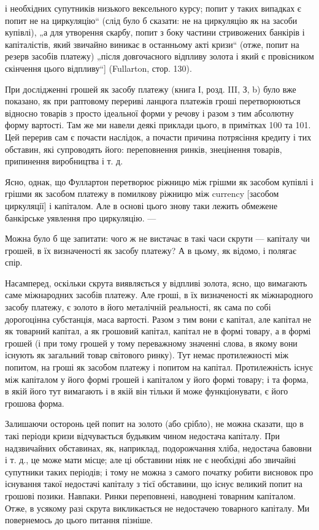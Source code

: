 \parcont{}  %
і необхідних супутників низького вексельного курсу; попит у таких
випадках є попит не на циркуляцію“ (слід було б сказати:
не на циркуляцію як на засоби купівлі), „а для утворення скарбу,
попит з боку частини стривожених банкірів і капіталістів, який
звичайно виникає в останньому акті кризи“ (отже, попит на резерв
засобів платежу) „після довгочасного відпливу золота і який є
провісником скінчення цього відпливу“] (Fullarton, стор. 130).

При дослідженні грошей як засобу платежу (книга І, розд. III,
З, b) було вже показано, як при раптовому перериві ланцюга платежів
гроші перетворюються відносно товарів з просто ідеальної
форми у речову і разом з тим абсолютну форму вартостi.
Там же ми навели деякі приклади цього, в примітках 100 та 101.
Цей перерив сам є почасти наслідок, а почасти причина потрясіння
кредиту і тих обставин, які супроводять його: переповнення
ринків, знецінення товарів, припинення виробництва і т. д.

Ясно, однак, що Фуллартон перетворює ріжницю між грішми як
засобом купівлі і грішми як засобом платежу в помилкову ріжницю
між currency [засобом циркуляції] і капіталом. Але в основі
цього знову таки лежить обмежене банкірське уявлення про
циркуляцію. —

Можна було б ще запитати: чого ж не вистачає в такі часи
скрути — капіталу чи грошей, в їх визначеності як засобу платежу?
А в цьому, як відомо, і полягає спір.

Насамперед, оскільки скрута виявляється у відпливі золота,
ясно, що вимагають саме міжнародних засобів платежу. Але
гроші, в їх визначеності як міжнародного засобу платежу, є
золото в його металічній реальності, як сама по собі дорогоцінна
субстанція, маса вартості. Разом з тим вони є капітал, але капітал
не як товарний капітал, а як грошовий капітал, капітал не
в формі товару, а в формі грошей (і при тому грошей у тому
переважному значенні слова, в якому вони існують як загальний
товар світового ринку). Тут немає протилежності між попитом,
на гроші як засобом платежу і попитом на капітал. Протилежність
існує між капіталом у його формі грошей і капіталом у
його формі товару; і та форма, в якій його тут вимагають і в
якій він тільки й може функціонувати, є його грошова форма.

Залишаючи осторонь цей попит на золото (або срібло), не
можна сказати, що в такі періоди кризи відчувається будьяким
чином недостача капіталу. При надзвичайних обставинах, як,
наприклад, подорожчання хліба, недостача бавовни і т. д., це
може мати місце; але ці обставини ніяк не є необхідні або звичайні
супутники таких періодів; і тому не можна з самого початку
робити висновок про існування такої недостачі капіталу
з тієї обставини, що існує великий попит на грошові позики.
Навпаки. Ринки переповнені, наводнені товарним капіталом.
Отже, в усякому разі скрута викликається не недостачею товарного
капіталу. Ми повернемось до цього питання пізніше.
\parbreak{}  %
